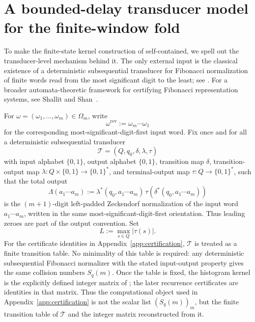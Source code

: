 \section{A bounded-delay transducer model for the finite-window fold}
\label{app:transducer}

To make the finite-state kernel construction of
 self-contained, we spell
out the transducer-level mechanism behind it.  The only external input is the
classical existence of a deterministic subsequential transducer for Fibonacci
normalization of finite words read from the most significant digit to the least;
see \cite{Frougny1992NumbersAutomata,Frougny1999OnlineAddition}.  For a broader
automata-theoretic framework for certifying Fibonacci representation systems,
see Shallit and Shan~\cite{ShallitShan2023}.

For \(\omega=(\omega_1,\dots,\omega_m)\in\Omega_m\), write
\[
  \omega^{\mathrm{rev}}:=\omega_m\cdots \omega_1
\]
for the corresponding most-significant-digit-first input word.  Fix once and
for all a deterministic subsequential transducer
\[
  \mathcal T=(Q,q_0,\delta,\lambda,\tau)
\]
with input alphabet \(\{0,1\}\), output alphabet \(\{0,1\}\), transition map
\(\delta\), transition-output map \(\lambda\colon Q\times\{0,1\}\to\{0,1\}^*\),
and terminal-output map \(\tau\colon Q\to\{0,1\}^*\), such that the total
output
\[
  \Lambda(a_1\cdots a_m)
  :=
  \lambda^*(q_0,a_1\cdots a_m)\,
  \tau(\delta^*(q_0,a_1\cdots a_m))
\]
is the \((m+1)\)-digit left-padded Zeckendorf normalization of the input word
\(a_1\cdots a_m\), written in the same most-significant-digit-first
orientation.  Thus leading zeroes are part of the output convention.  Set
\[
  L:=\max_{s\in Q}|\tau(s)|.
\]
For the certificate identities in Appendix~\ref{app:certification},
\(\mathcal T\) is treated as a finite transition table.  No minimality of this
table is required: any deterministic subsequential Fibonacci normalizer with the
stated input-output property gives the same collision numbers \(S_q(m)\).  Once
the table is fixed, the histogram kernel is the explicitly defined integer
matrix of ; the later recurrence certificates
are identities in that matrix.  Thus the computational object used in
Appendix~\ref{app:certification} is not the scalar list
\((S_q(m))_m\), but the finite transition table of \(\mathcal T\) and the
integer matrix reconstructed from it.

